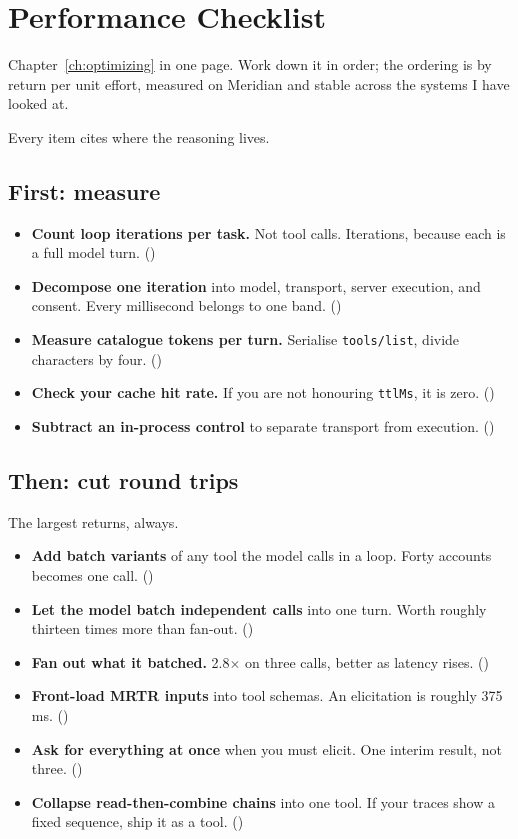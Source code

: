 \chapter{Performance Checklist}
\label{ch:perf-checklist}

Chapter~\ref{ch:optimizing} in one page. Work down it in order; the ordering is
by return per unit effort, measured on Meridian and stable across the systems I
have looked at.

Every item cites where the reasoning lives.

\section{First: measure}

\begin{itemize}[leftmargin=1.6em, itemsep=3pt]
\item[$\square$] \textbf{Count loop iterations per task.} Not tool calls.
Iterations, because each is a full model turn. ()
\item[$\square$] \textbf{Decompose one iteration} into model, transport, server
execution, and consent. Every millisecond belongs to one band.
()
\item[$\square$] \textbf{Measure catalogue tokens per turn.} Serialise
\texttt{tools/list}, divide characters by four. ()
\item[$\square$] \textbf{Check your cache hit rate.} If you are not honouring
\texttt{ttlMs}, it is zero. ()
\item[$\square$] \textbf{Subtract an in-process control} to separate transport
from execution. ()
\end{itemize}

\section{Then: cut round trips}

The largest returns, always.

\begin{itemize}[leftmargin=1.6em, itemsep=3pt]
\item[$\square$] \textbf{Add batch variants} of any tool the model calls in a
loop. Forty accounts becomes one call. ()
\item[$\square$] \textbf{Let the model batch independent calls} into one turn.
Worth roughly thirteen times more than fan-out. ()
\item[$\square$] \textbf{Fan out what it batched.} 2.8$\times$ on three calls,
better as latency rises. ()
\item[$\square$] \textbf{Front-load MRTR inputs} into tool schemas. An
elicitation is roughly 375\,ms. ()
\item[$\square$] \textbf{Ask for everything at once} when you must elicit. One
interim result, not three. ()
\item[$\square$] \textbf{Collapse read-then-combine chains} into one tool. If
your traces show a fixed sequence, ship it as a tool. ()
\end{itemize}

